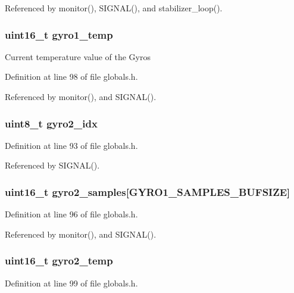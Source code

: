 Referenced by monitor(), SIGNAL(), and stabilizer\_\-loop().
\subsubsection{\setlength{\rightskip}{0pt plus 5cm}uint16\_\-t {\bf gyro1\_\-temp}}\label{group__ro__globals_ge1343751a53f8acfe15529257d40d919}


Current temperature value of the Gyros 

Definition at line 98 of file globals.h.

Referenced by monitor(), and SIGNAL().
\subsubsection{\setlength{\rightskip}{0pt plus 5cm}uint8\_\-t {\bf gyro2\_\-idx}}\label{group__ro__globals_g4beaab24cfaab8dc83e8381193cd3d29}




Definition at line 93 of file globals.h.

Referenced by SIGNAL().
\subsubsection{\setlength{\rightskip}{0pt plus 5cm}uint16\_\-t {\bf gyro2\_\-samples}[GYRO1\_\-SAMPLES\_\-BUFSIZE]}\label{group__ro__globals_g74aec8575654ee30d4368a9b21d7eef3}




Definition at line 96 of file globals.h.

Referenced by monitor(), and SIGNAL().
\subsubsection{\setlength{\rightskip}{0pt plus 5cm}uint16\_\-t {\bf gyro2\_\-temp}}\label{group__ro__globals_gfc06975225ead84b5fe6989cd85fef69}




Definition at line 99 of file globals.h.

